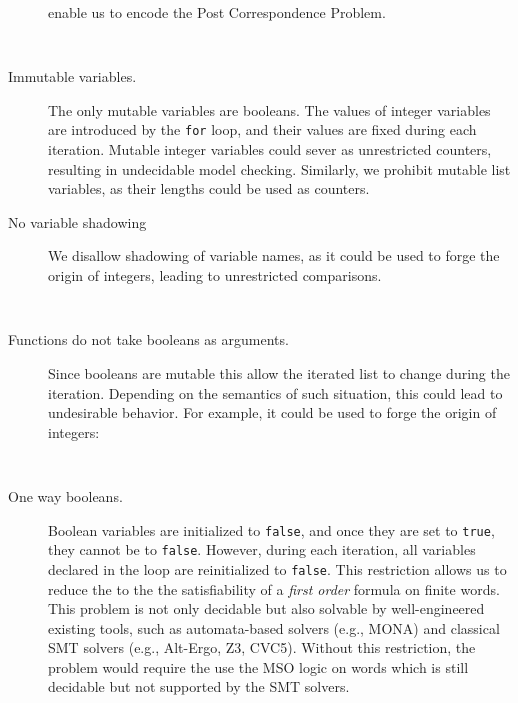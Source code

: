 \begin{description}
          enable us to encode the Post Correspondence Problem.
          \begin{verbatim}
            
          \end{verbatim}
    \item [Immutable variables.] The only mutable variables are booleans.
          The values of integer variables are introduced by the \texttt{for} loop,
          and their values are fixed during each iteration. Mutable integer variables
          could sever as unrestricted counters, resulting in undecidable model checking.
          Similarly, we prohibit mutable list variables, as their lengths could be used 
          as counters. %
    \item [No variable shadowing] We disallow shadowing of variable names, as it could
          be used to forge the origin of integers, leading to unrestricted comparisons.
          \begin{verbatim}
            
          \end{verbatim} 
    \item [Functions do not take booleans as arguments.] Since booleans are mutable
          this allow the iterated list to change during the iteration. Depending on the
          semantics of such situation, this could lead to undesirable behavior. For example, 
          it could be used to forge the origin of integers:
          \begin{verbatim}
            
          \end{verbatim} 
    \item [One way booleans.] Boolean variables are initialized to \texttt{false}, and 
           once they are set to \texttt{true}, they cannot be to \texttt{false}.
           However, during each iteration, all variables declared in the loop are reinitialized to \texttt{false}.
           This restriction allows us to reduce the  to the the satisfiability
           of a \emph{first order} formula on finite words. This problem is not only decidable
           but also solvable by well-engineered existing tools, such as automata-based solvers (e.g., MONA) and classical SMT solvers (e.g., Alt-Ergo, Z3, CVC5).
           Without this restriction, the problem would require the use the MSO logic on words which is still decidable but
           not supported by the SMT solvers.
\end{description}



